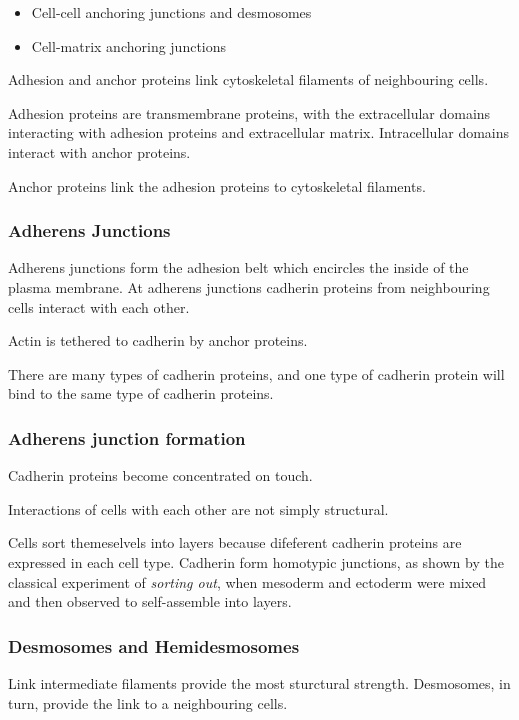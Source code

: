 \documentclass[11pt]{scrartcl}
\begin{document}
\begin{itemize}
\item Cell-cell anchoring junctions and desmosomes
\item Cell-matrix anchoring junctions
\end{itemize}

Adhesion and anchor proteins link cytoskeletal filaments of neighbouring cells.

Adhesion proteins are transmembrane proteins, with the extracellular
domains interacting with adhesion proteins and extracellular
matrix. Intracellular domains interact with anchor proteins.

Anchor proteins link the adhesion proteins to cytoskeletal filaments. 

\subsubsection{Adherens Junctions}

Adherens junctions form the adhesion belt which encircles the inside
of the plasma membrane. At adherens junctions cadherin proteins from
neighbouring cells interact with each other.

Actin is tethered to cadherin by anchor proteins.

There are many types of cadherin proteins, and one type of cadherin
protein will bind to the same type of cadherin proteins.

\subsubsection{Adherens junction formation}

Cadherin proteins become concentrated on touch.

Interactions of cells with each other are not simply structural.

Cells sort themeselvels into layers because difeferent cadherin
proteins are expressed in each cell type. Cadherin form homotypic
junctions, as shown by the classical experiment of \textit{sorting
  out}, when mesoderm and ectoderm were mixed and then observed to
self-assemble into layers.

\subsubsection{Desmosomes and Hemidesmosomes}

Link intermediate filaments provide the most sturctural strength. Desmosomes, in turn, provide the link to a neighbouring cells.
\end{document}
